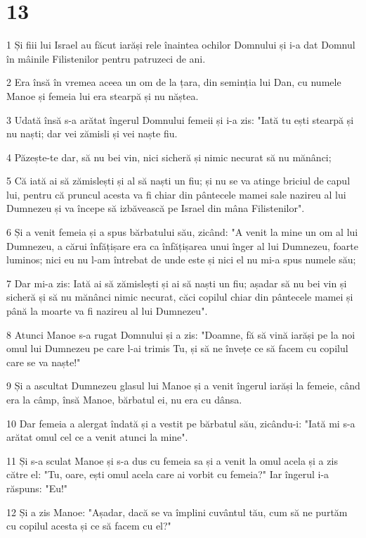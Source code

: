 \chapter{13}

\par 1 Și fiii lui Israel au făcut iarăși rele înaintea ochilor Domnului și i-a dat Domnul în mâinile Filistenilor pentru patruzeci de ani.
\par 2 Era însă în vremea aceea un om de la țara, din seminția lui Dan, cu numele Manoe și femeia lui era stearpă și nu năștea.
\par 3 Udată însă s-a arătat îngerul Domnului femeii și i-a zis: "Iată tu ești stearpă și nu naști; dar vei zămisli și vei naște fiu.
\par 4 Păzește-te dar, să nu bei vin, nici sicheră și nimic necurat să nu mănânci;
\par 5 Că iată ai să zămislești și al să naști un fiu; și nu se va atinge briciul de capul lui, pentru că pruncul acesta va fi chiar din pântecele mamei sale nazireu al lui Dumnezeu și va începe să izbăvească pe Israel din mâna Filistenilor".
\par 6 Și a venit femeia și a spus bărbatului său, zicând: "A venit la mine un om al lui Dumnezeu, a cărui înfățișare era ca înfățișarea unui înger al lui Dumnezeu, foarte luminos; nici eu nu l-am întrebat de unde este și nici el nu mi-a spus numele său;
\par 7 Dar mi-a zis: Iată ai să zămislești și ai să naști un fiu; așadar să nu bei vin și sicheră și să nu mănânci nimic necurat, căci copilul chiar din pântecele mamei și până la moarte va fi nazireu al lui Dumnezeu".
\par 8 Atunci Manoe s-a rugat Domnului și a zis: "Doamne, fă să vină iarăși pe la noi omul lui Dumnezeu pe care l-ai trimis Tu, și să ne învețe ce să facem cu copilul care se va naște!"
\par 9 Și a ascultat Dumnezeu glasul lui Manoe și a venit îngerul iarăși la femeie, când era la câmp, însă Manoe, bărbatul ei, nu era cu dânsa.
\par 10 Dar femeia a alergat îndată și a vestit pe bărbatul său, zicându-i: "Iată mi s-a arătat omul cel ce a venit atunci la mine".
\par 11 Și s-a sculat Manoe și s-a dus cu femeia sa și a venit la omul acela și a zis către el: "Tu, oare, ești omul acela care ai vorbit cu femeia?" Iar îngerul i-a răspuns: "Eu!"
\par 12 Și a zis Manoe: "Așadar, dacă se va împlini cuvântul tău, cum să ne purtăm cu copilul acesta și ce să facem cu el?"
